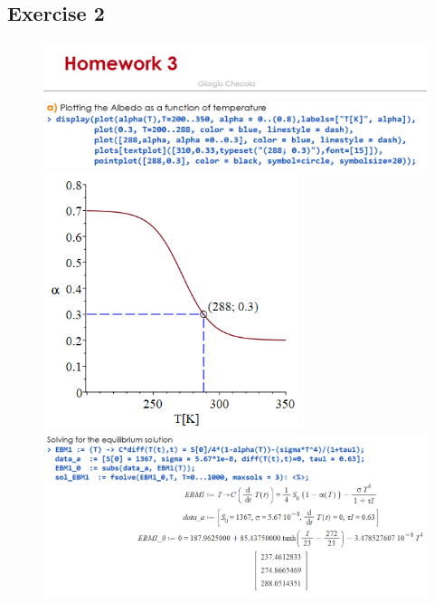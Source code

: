 \documentclass[11pt,a4paper]{article}
\begin{document}
\subsection{Exercise 2}
\begin{figure}[H]
	\centering 
	\includegraphics[width=150mm]{images/es0.PNG}
	
	\bigskip
	
	\includegraphics[width=150mm]{images/es2_0.PNG}
	
	\smallskip
	
	\includegraphics[width=75mm]{images/plot1.PNG}
	
	\bigskip
	
	\includegraphics[width=150mm]{images/es2_1.PNG}

\end{figure}
\end{document}
